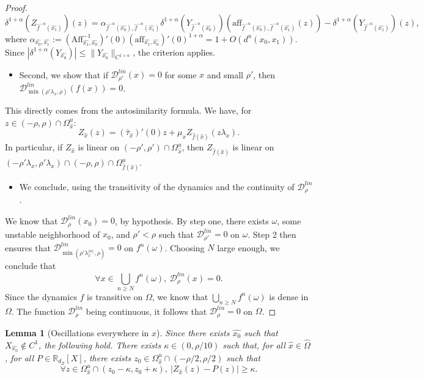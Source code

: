\documentclass[a4paper]{article}
\newtheorem{lemma}[theorem]{Lemma}
\theoremstyle{definition}
\begin{document}
\begin{proof}
$$ \delta^{1+\alpha}(Z_{\widehat{f}^{-n}(\widehat{x_1})})(z) = \alpha_{\widehat{f}^{-n}(\widehat{x_0}),\widehat{f}^{-n}(\widehat{x_1})} \delta^{1+\alpha}(Y_{\widehat{f}^{-n}(\widehat{x_0})})(\text{aff}_{\widehat{f}^{-n}(\widehat{x_0}),\widehat{f}^{-n}(\widehat{x_1})}(z)) - \delta^{1+\alpha}(Y_{\widehat{f}^{-n}(\widehat{x_1})})(z) , $$
where $\alpha_{\widehat{x_0},\widehat{x_1}} := (\text{Aff}^{-1}_{\widehat{x_1},\widehat{x_0}})'(0) (\text{aff}_{\widehat{x_1},\widehat{x_0}})'(0)^{1+\alpha} = 1 + O(d^u(x_0,x_1))$.
Since $|\delta^{1+\alpha}(Y_{\widehat{x_0}})| \leq \|Y_{\widehat{x_0}}\|_{C^{1+\alpha}}$, the criterion applies.
\begin{itemize}
\item Second, we show that if $\mathcal{D}_{\rho'}^{lin}(x)=0$ for some $x$ and small $\rho'$, then $\mathcal{D}_{\min(\rho' \lambda_x,\rho)}^{lin}(f(x))=0$. \end{itemize}
This directly comes from the autosimilarity formula. We have, for $z \in (-\rho,\rho) \cap \Omega_{\widehat{x}}^u$:
$$ Z_{\widehat{x}}(z) = (\widehat{\tau}_{\widehat{x}})'(0)z + \mu_x Z_{\widehat{f}({\widehat{x}})}(z \lambda_x). $$
In particular, if $ Z_{\widehat{x}}$ is linear on $(-\rho',\rho') \cap \Omega_{\widehat{x}}^u$, then $Z_{\widehat{f}({\widehat{x}})}$ is linear on $(-\rho' \lambda_x,\rho' \lambda_x) \cap (-\rho,\rho) \cap \Omega_{\widehat{f}({\widehat{x}})}^u$.
\begin{itemize}
\item We conclude, using the transitivity of the dynamics and the continuity of $\mathcal{D}_\rho^{lin}$. \end{itemize}
We know that $\mathcal{D}_\rho^{lin}(x_0)=0$, by hypothesis. By step one, there exists $\omega$, some unstable neighborhood of $x_0$, and $\rho'<\rho$ such that $\mathcal{D}_{\rho'}^{lin}=0$ on $\omega$. Step 2 then ensures that $\mathcal{D}_{\min(\rho' \lambda_x^{\langle n \rangle} , \rho)}^{lin}=0$ on $f^n(\omega)$. Choosing $N$ large enough, we conclude that
$$ \forall x \in \bigcup_{n \geq N} f^n(\omega), \ \mathcal{D}_\rho^{lin}(x) = 0 .$$
Since the dynamics $f$ is transitive on $\Omega$, we know that $\bigcup_{n \geq N} f^n(\omega)$ is dense in $\Omega$. The function $\mathcal{D}_\rho^{lin}$ being continuous, it follows that $\mathcal{D}_\rho^{lin}=0$ on $\Omega$. \end{proof}

\begin{lemma}[Oscillations everywhere in $x$]
Since there exists ${\widehat{x_0}}$ such that $X_{\widehat{x_0}} \notin C^1$, the following hold. There exists $\kappa \in (0,\rho/10)$ such that, for all ${\widehat{x}} \in \widehat{\Omega}$, for all $P \in \mathbb{R}_{d_Z}[X]$, there exists $z_0 \in \Omega_{\widehat{x}}^u \cap (-\rho/2,\rho/2)$ such that
$$ \forall z \in \Omega_{\widehat{x}}^u \cap (z_0 - \kappa, z_0 + \kappa), \  |Z_{\widehat{x}}(z) - P(z)| \geq \kappa. $$
\end{lemma}
\end{document}
